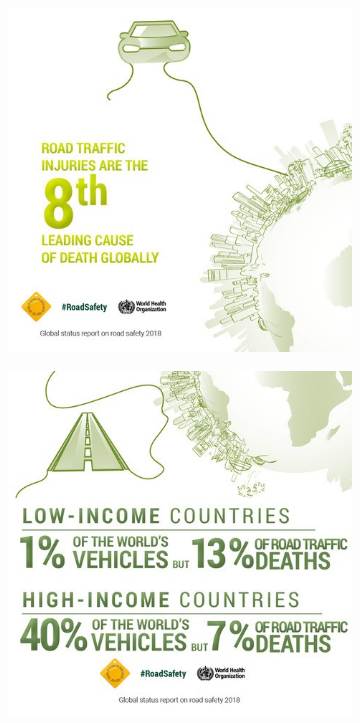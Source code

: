 \begin{figure}[!ht]
\begin{subfigure}[c]{0.3\textwidth}
		\label{fig:test_image_3}
	\end{subfigure}
	\medskip
	\begin{subfigure}[c]{0.3\textwidth}
		\includegraphics[width=\textwidth]{img/road_safety/8th-leading-cause.jpg}
		\label{fig:test_image_4}
	\end{subfigure}
	\quad
	\begin{subfigure}[c]{0.3\textwidth}
		\includegraphics[width=\textwidth]{img/road_safety/Low-income-countries.jpg}

\end{subfigure}
\end{figure}
